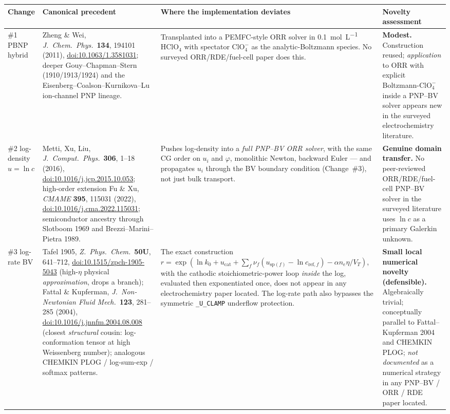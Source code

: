 \documentclass[11pt]{article}
\newcommand{\VT}{V_{T}}
\newcommand{\ClOf}{\mathrm{ClO}_4^{-}}
\begin{document}
\begin{center}\small
\renewcommand{\arraystretch}{1.4}
\begin{tabular}{@{}p{} p{} p{} p{}@{}}
\toprule
\textbf{Change} & \textbf{Canonical precedent} & \textbf{Where the implementation deviates} & \textbf{Novelty assessment} \\
\midrule
\#1 PBNP hybrid &
Zheng \& Wei, \emph{J.~Chem.~Phys.}\ \textbf{134}, 194101 (2011),
\href{https://doi.org/10.1063/1.3581031}{doi:10.1063/1.3581031}; deeper
Gouy--Chapman--Stern (1910/1913/1924) and the Eisenberg--Coalson--Kurnikova--Lu
ion-channel PNP lineage. &
Transplanted into a PEMFC-style ORR solver in \SI{0.1}{\mole\per\liter}
$\mathrm{HClO}_4$ with spectator $\ClOf$ as the analytic-Boltzmann species.
No surveyed ORR/RDE/fuel-cell paper does this. &
\textbf{Modest.} Construction reused; \emph{application} to ORR with explicit
Boltzmann-$\ClOf$ inside a PNP--BV solver appears new in the surveyed
electrochemistry literature. \\
\midrule
\#2 log-density $u=\ln c$ &
Metti, Xu, Liu, \emph{J.~Comput.~Phys.}\ \textbf{306}, 1--18 (2016),
\href{https://doi.org/10.1016/j.jcp.2015.10.053}{doi:10.1016/j.jcp.2015.10.053};
high-order extension Fu \& Xu, \emph{CMAME} \textbf{395}, 115031 (2022),
\href{https://doi.org/10.1016/j.cma.2022.115031}{doi:10.1016/j.cma.2022.115031};
semiconductor ancestry through Slotboom 1969 and Brezzi--Marini--Pietra 1989. &
Pushes log-density into a \emph{full PNP--BV ORR solver}, with the same CG
order on $u_i$ and $\varphi$, monolithic Newton, backward Euler --- and
propagates $u_i$ through the BV boundary condition (Change~\#3), not just bulk
transport. &
\textbf{Genuine domain transfer.} No peer-reviewed ORR/RDE/fuel-cell PNP--BV
solver in the surveyed literature uses $\ln c$ as a primary Galerkin
unknown. \\
\midrule
\#3 log-rate BV &
Tafel 1905, \emph{Z.~Phys.~Chem.}\ \textbf{50U}, 641--712,
\href{https://doi.org/10.1515/zpch-1905-5043}{doi:10.1515/zpch-1905-5043}
(high-$\eta$ physical \emph{approximation}, drops a branch);
Fattal \& Kupferman, \emph{J.~Non-Newtonian Fluid Mech.}\ \textbf{123},
281--285 (2004),
\href{https://doi.org/10.1016/j.jnnfm.2004.08.008}{doi:10.1016/j.jnnfm.2004.08.008}
(closest \emph{structural} cousin: log-conformation tensor at high Weissenberg
number); analogous CHEMKIN PLOG / log-sum-exp / softmax patterns. &
The exact construction
$r=\exp(\ln k_0+u_{\mathrm{cat}}+\sum_f\nu_f(u_{\mathrm{sp}(f)}-\ln c_{\mathrm{ref},f})-\alpha n_e\eta/\VT)$,
with the cathodic stoichiometric-power loop \emph{inside} the log, evaluated
then exponentiated once, does not appear in any electrochemistry paper
located. The log-rate path also bypasses the symmetric \texttt{\_U\_CLAMP}
underflow protection. &
\textbf{Small local numerical novelty (defensible).} Algebraically trivial;
conceptually parallel to Fattal--Kupferman 2004 and CHEMKIN PLOG;
\emph{not documented} as a numerical strategy in any PNP--BV / ORR / RDE
paper located. \\
\bottomrule
\end{tabular}
\end{center}
\end{document}
